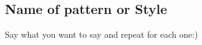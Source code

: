 
\subsection{Name of pattern or Style} 
\begin{flushleft}
Say what you want to say and repeat for each one:)

\end{flushleft}






